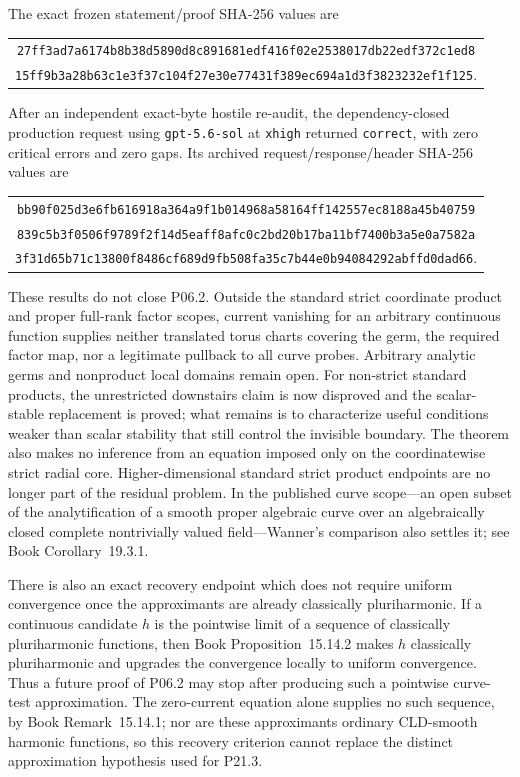 \documentclass[11pt,a4paper]{article}
\theoremstyle{definition}
\theoremstyle{remark}
\begin{document}
The exact frozen statement/proof SHA-256 values are
\begin{center}
\small
\begin{tabular}{@{}c@{}}
\nolinkurl{27ff3ad7a6174b8b38d5890d8c891681edf416f02e2538017db22edf372c1ed8}\\
\nolinkurl{15ff9b3a28b63c1e3f37c104f27e30e77431f389ec694a1d3f3823232ef1f125}.
\end{tabular}
\end{center}
After an independent exact-byte hostile re-audit, the dependency-closed
production request using \texttt{gpt-5.6-sol} at \texttt{xhigh} returned
\texttt{correct}, with zero critical errors and zero gaps.  Its archived
request/response/header SHA-256 values are
\begin{center}
\small
\begin{tabular}{@{}c@{}}
\nolinkurl{bb90f025d3e6fb616918a364a9f1b014968a58164ff142557ec8188a45b40759}\\
\nolinkurl{839c5b3f0506f9789f2f14d5eaff8afc0c2bd20b17ba11bf7400b3a5e0a7582a}\\
\nolinkurl{3f31d65b71c13800f8486cf689d9fb508fa35c7b44e0b94084292abffd0dad66}.
\end{tabular}
\end{center}

These results do not close P06.2.  Outside the standard strict coordinate
product and proper full-rank factor scopes, current vanishing for an
arbitrary continuous function supplies neither translated torus charts
covering the germ, the required factor map, nor a legitimate pullback to all
curve probes.  Arbitrary analytic germs and nonproduct local domains remain
open.  For non-strict standard products, the unrestricted downstairs claim
is now disproved and the scalar-stable replacement is proved; what remains is
to characterize useful conditions weaker than scalar stability that still
control the invisible boundary.  The theorem also makes no inference from
an equation imposed only on the coordinatewise strict radial core.
Higher-dimensional standard strict product endpoints are no longer part of
the residual problem.  In the
published curve scope---an open subset of the analytification of a smooth
proper algebraic curve over an algebraically closed complete nontrivially
valued field---Wanner's comparison also settles it; see
Book Corollary~19.3.1.

There is also an exact recovery endpoint which does not require uniform
convergence once the approximants are already classically pluriharmonic.  If
a continuous candidate \(h\) is the pointwise limit of a sequence of
classically pluriharmonic functions, then
Book Proposition~15.14.2 makes \(h\) classically
pluriharmonic and upgrades the convergence locally to uniform convergence.
Thus a future proof of P06.2 may stop after producing such a pointwise
curve-test approximation.  The zero-current equation alone supplies no
such sequence, by Book Remark~15.14.1; nor are these
approximants ordinary CLD-smooth harmonic functions, so this recovery
criterion cannot replace the distinct approximation hypothesis used for
P21.3.
\end{document}
